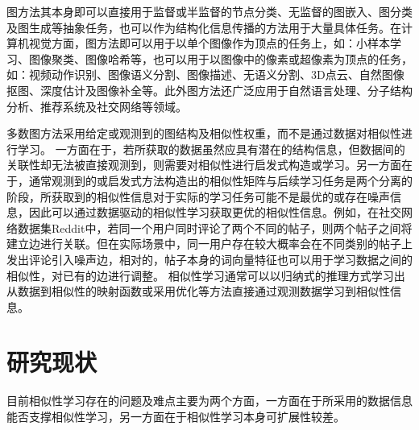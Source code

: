 图方法其本身即可以直接用于监督或半监督的节点分类\cite{kipf2016semi,velivckovic2017graph,hamilton2017inductive}、无监督的图嵌入\cite{roweis2000nonlinear,belkin2001laplacian,perozzi2014deepwalk,kipf2016variational}、图分类\cite{shervashidze2011weisfeiler,defferrard2016convolutional,zhang2018end,xu2018how}及图生成\cite{simonovsky2018graphvae,de2018molgan,li2018learning}等抽象任务，也可以作为结构化信息传播的方法用于大量具体任务。在计算机视觉方面，图方法即可以用于以单个图像作为顶点的任务上，如：小样本学习\cite{garcia2018fewshot}、图像聚类\cite{blaschko2008correlational}、图像哈希\cite{weiss2009spectral}等，也可以用于以图像中的像素或超像素为顶点的任务，如：视频动作识别\cite{wang2018non}、图像语义分割\cite{huang2019interlaced}、图像描述\cite{yao2018exploring}、无语义分割\cite{shi2000normalized}、3D点云\cite{wang2019dynamic}、自然图像抠图\cite{levin2008closed}、深度估计\cite{cheng2018depth}及图像补全\cite{yu2018generative}等。此外图方法还广泛应用于自然语言处理\cite{vaswani2017attention}、分子结构分析\cite{kearnes2016molecular}、推荐系统\cite{ying2018graph}及社交网络\cite{hamilton2017inductive}等领域。


多数图方法采用给定或观测到的图结构及相似性权重，而不是通过数据对相似性进行学习。
一方面在于，若所获取的数据虽然应具有潜在的结构信息，但数据间的关联性却无法被直接观测到，则需要对相似性进行启发式构造或学习。另一方面在于，通常观测到的或启发式方法构造出的相似性矩阵与后续学习任务是两个分离的阶段，所获取到的相似性信息对于实际的学习任务可能不是最优的或存在噪声信息，因此可以通过数据驱动的相似性学习获取更优的相似性信息。例如，在社交网络数据集Reddit\cite{hamilton2017inductive}中，若同一个用户同时评论了两个不同的帖子，则两个帖子之间将建立边进行关联。但在实际场景中，同一用户存在较大概率会在不同类别的帖子上发出评论引入噪声边，相对的，帖子本身的词向量特征也可以用于学习数据之间的相似性，对已有的边进行调整。
相似性学习通常可以以归纳式的推理方式学习出从数据到相似性的映射函数\cite{meila2001learning}或采用优化等方法直接通过观测数据学习到相似性信息\cite{nie2014clustering}。

\section{研究现状}

目前相似性学习存在的问题及难点主要为两个方面，一方面在于所采用的数据信息能否支撑相似性学习，另一方面在于相似性学习本身可扩展性较差。

